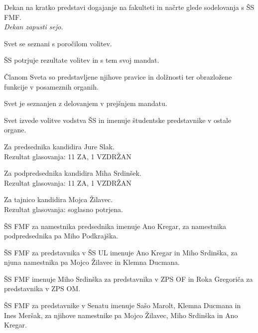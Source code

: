 \documentclass{seja}
\begin{document}
\begin{ad}
\item
Dekan na kratko predstavi dogajanje na fakulteti in načrte glede sodelovanja s ŠS FMF. \\
\textit{Dekan zapusti sejo.}

\item Svet se seznani s poročilom volitev.

\begin{sklep*}
ŠS potrjuje rezultate volitev in s tem svoj mandat.
\end{sklep*}

\item
Članom Sveta so predstavljene njihove pravice in dolžnosti ter obrazložene
funkcije v posameznih organih.

\item
Svet  je  seznanjen  z  delovanjem v prejšnjem mandatu.

\item
Svet  izvede volitve vodstva ŠS in  imenuje študentske predstavnike v ostale organe.

Za predsednika kandidira Jure Slak.  \\
Rezultat glasovanja: 11 ZA, 1 VZDRŽAN

Za podpredsednika kandidira Miha Srdinšek. \\
Rezultat glasovanja: 11 ZA, 1 VZDRŽAN

Za tajnico kandidira Mojca Žilavec.  \\
Rezultat glasovanja: soglasno potrjena.

\begin{sklep*}
ŠS FMF za namestnika predsednika imenuje Ano Kregar, za namestnika podpredsednika pa Miho Podkrajška.
\end{sklep*}

\begin{sklep*}
ŠS FMF za predstavnika v ŠS UL imenuje Ano Kregar in Miho Srdinška, za njuna namestnika pa Mojco Žilavec in Klemna Ducmana.
\end{sklep*}

\begin{sklep*}
ŠS FMF imenuje Miho Srdinška za predstavnika v ZPS OF in Roka Gregoriča za predstavnika v ZPS OM.
\end{sklep*}

\begin{sklep*}
ŠS FMF za predstavnike v Senatu imenuje Sašo Marolt, Klemna Ducmana in Ines Meršak, za njihove namestnike pa Mojco Žilavec, Miho Srdinška in Ano Kregar.
\end{sklep*}


\end{ad}
\end{document}
